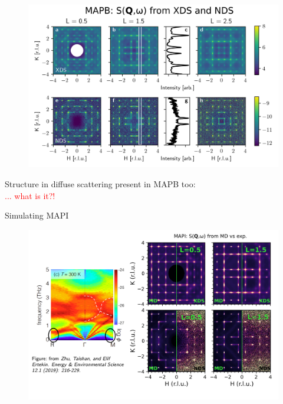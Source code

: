 \documentclass[12pt]{beamer}
\begin{document}

\begin{frame} %

\begin{figure}
    \includegraphics[width=0.9\linewidth]{figs/MAPB.png}
\end{figure}

Structure in diffuse scattering present in MAPB too: \\
\textcolor{red}{... what is it?!}

\end{frame}


\begin{frame}{Simulating MAPI}

\begin{figure}
    \includegraphics[width=1.0\linewidth]{figs/elif.png}
\end{figure}

\end{frame}
\end{document}
